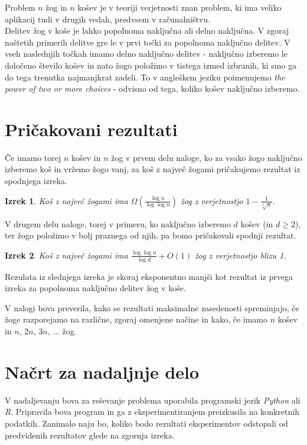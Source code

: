 \documentclass[a4paper, 11pt]{article}
\newtheorem{Izrek}{Izrek}
\begin{document}
Problem $n$ žog in $n$ košev je v teoriji verjetnosti znan problem, ki ima veliko aplikacij tudi v drugih vedah, predvsem v računalništvu.\\
Delitev žog v koše je lahko popolnoma naključna ali delno naključna.
V zgoraj naštetih primerih delitve gre le v prvi točki za popolnoma naključno delitev.
V vseh naslednjih točkah imamo delno naključno delitev - naključno izberemo le določeno število košev in nato žogo položimo v tistega izmed izbranih,
ki smo ga do tega trenutka najmanjkrat zadeli. To v angleškem jeziku poimenujemo \emph{the power of
two or more choices} - odvisno od tega, koliko košev naključno izberemo.

\section{Pričakovani rezultati}

Če imamo torej $n$ košev in $n$ žog v prvem delu naloge, ko za vsako žogo naključno izberemo koš in vržemo žogo vanj,
za koš z največ žogami pričakujemo rezultat iz spodnjega izreka.

\begin{Izrek}
    Koš z največ žogami ima $\Omega (\frac{\log{n}}{\log{\log{n}}})$ žog z verjetnostjo $1 - \frac{1}{\sqrt[3]{n}}$.
\end{Izrek}

V drugem delu naloge, torej v primeru, ko naključno izberemo $d$ košev (in $d \geq 2$), ter žogo položimo v bolj praznega od njih,
pa bomo pričakovali spodnji rezultat.

\begin{Izrek}
    Koš z največ žogami ima $\frac{\log {\log{n}}}{\log{d}} + O(1)$ žog z verjetnostjo blizu 1.
\end{Izrek}

Rezulata iz slednjega izreka je skoraj eksponentno manjši kot rezultat iz prvega izreka za popolnoma naključno delitev žog v koše.

V nalogi bova preverila, kako se rezultati maksimalne zasedenosti spreminjajo, če žoge razporejamo na različne, zgoraj omenjene načine
in kako, če imamo $n$ košev in $n$, $2n$, $3n$, ... žog.

\section{Načrt za nadaljnje delo}
V nadaljevanju bova za reševanje problema uporabila programski jezik \emph{Python} ali \emph{R}.
Pripravila bova program in ga z eksperimentiranjem preizkusila na konkretnih podatkih. Zanimalo naju bo,
koliko bodo rezultati eksperimentov odstopali od predvidenih rezultatov glede na zgornja izreka.
\end{document}
